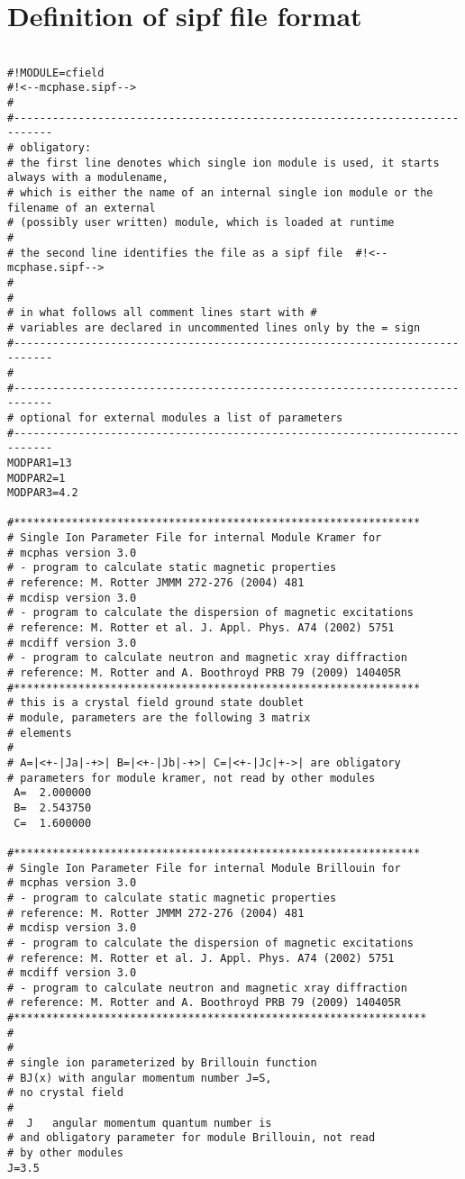 \section{Definition of sipf file format}

\begin{verbatim}

#!MODULE=cfield
#!<--mcphase.sipf-->
#
#----------------------------------------------------------------------------
# obligatory: 
# the first line denotes which single ion module is used, it starts always with a modulename, 
# which is either the name of an internal single ion module or the filename of an external
# (possibly user written) module, which is loaded at runtime
#
# the second line identifies the file as a sipf file  #!<--mcphase.sipf-->
#
#
# in what follows all comment lines start with #
# variables are declared in uncommented lines only by the = sign
#----------------------------------------------------------------------------
#
#----------------------------------------------------------------------------
# optional for external modules a list of parameters
#----------------------------------------------------------------------------
MODPAR1=13
MODPAR2=1
MODPAR3=4.2

#***************************************************************
# Single Ion Parameter File for internal Module Kramer for  
# mcphas version 3.0
# - program to calculate static magnetic properties
# reference: M. Rotter JMMM 272-276 (2004) 481
# mcdisp version 3.0
# - program to calculate the dispersion of magnetic excitations
# reference: M. Rotter et al. J. Appl. Phys. A74 (2002) 5751
# mcdiff version 3.0
# - program to calculate neutron and magnetic xray diffraction
# reference: M. Rotter and A. Boothroyd PRB 79 (2009) 140405R
#***************************************************************
# this is a crystal field ground state doublet
# module, parameters are the following 3 matrix
# elements
#
# A=|<+-|Ja|-+>| B=|<+-|Jb|-+>| C=|<+-|Jc|+->| are obligatory
# parameters for module kramer, not read by other modules
 A=  2.000000 
 B=  2.543750 
 C=  1.600000

#***************************************************************
# Single Ion Parameter File for internal Module Brillouin for
# mcphas version 3.0
# - program to calculate static magnetic properties
# reference: M. Rotter JMMM 272-276 (2004) 481
# mcdisp version 3.0
# - program to calculate the dispersion of magnetic excitations
# reference: M. Rotter et al. J. Appl. Phys. A74 (2002) 5751
# mcdiff version 3.0
# - program to calculate neutron and magnetic xray diffraction
# reference: M. Rotter and A. Boothroyd PRB 79 (2009) 140405R
#****************************************************************
#
#
# single ion parameterized by Brillouin function
# BJ(x) with angular momentum number J=S,
# no crystal field
#
#  J   angular momentum quantum number is
# and obligatory parameter for module Brillouin, not read
# by other modules
J=3.5


\end{verbatim}
